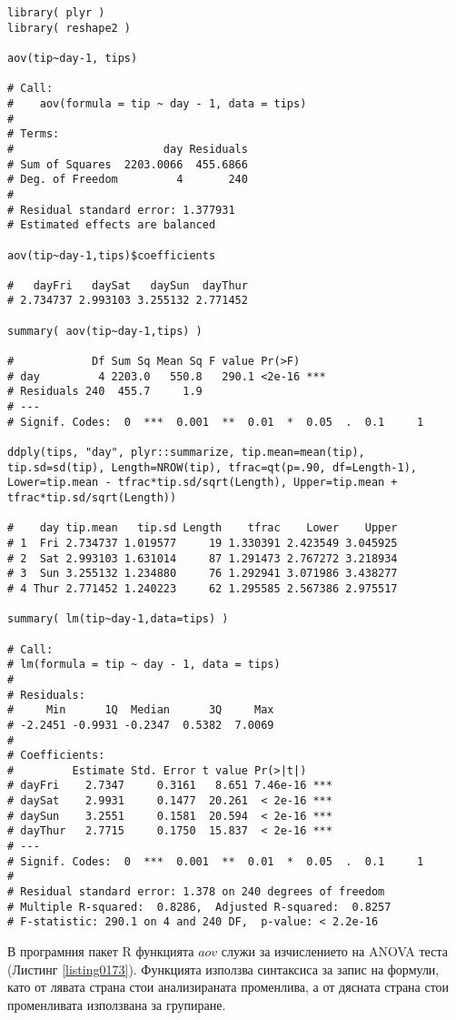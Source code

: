\begin{lstlisting}[caption=ANOVA тест, label=listing0173]
library( plyr )
library( reshape2 )

aov(tip~day-1, tips)

# Call:
#    aov(formula = tip ~ day - 1, data = tips)
# 
# Terms:
#                       day Residuals
# Sum of Squares  2203.0066  455.6866
# Deg. of Freedom         4       240
# 
# Residual standard error: 1.377931
# Estimated effects are balanced

aov(tip~day-1,tips)$coefficients

#   dayFri   daySat   daySun  dayThur 
# 2.734737 2.993103 3.255132 2.771452 

summary( aov(tip~day-1,tips) )

#            Df Sum Sq Mean Sq F value Pr(>F)    
# day         4 2203.0   550.8   290.1 <2e-16 ***
# Residuals 240  455.7     1.9                   
# ---
# Signif. Codes:  0  ***  0.001  **  0.01  *  0.05  .  0.1     1

ddply(tips, "day", plyr::summarize, tip.mean=mean(tip), tip.sd=sd(tip), Length=NROW(tip), tfrac=qt(p=.90, df=Length-1), Lower=tip.mean - tfrac*tip.sd/sqrt(Length), Upper=tip.mean + tfrac*tip.sd/sqrt(Length))

#    day tip.mean   tip.sd Length    tfrac    Lower    Upper
# 1  Fri 2.734737 1.019577     19 1.330391 2.423549 3.045925
# 2  Sat 2.993103 1.631014     87 1.291473 2.767272 3.218934
# 3  Sun 3.255132 1.234880     76 1.292941 3.071986 3.438277
# 4 Thur 2.771452 1.240223     62 1.295585 2.567386 2.975517

summary( lm(tip~day-1,data=tips) )

# Call:
# lm(formula = tip ~ day - 1, data = tips)
# 
# Residuals:
#     Min      1Q  Median      3Q     Max 
# -2.2451 -0.9931 -0.2347  0.5382  7.0069 
# 
# Coefficients:
#         Estimate Std. Error t value Pr(>|t|)    
# dayFri    2.7347     0.3161   8.651 7.46e-16 ***
# daySat    2.9931     0.1477  20.261  < 2e-16 ***
# daySun    3.2551     0.1581  20.594  < 2e-16 ***
# dayThur   2.7715     0.1750  15.837  < 2e-16 ***
# ---
# Signif. Codes:  0  ***  0.001  **  0.01  *  0.05  .  0.1     1
# 
# Residual standard error: 1.378 on 240 degrees of freedom
# Multiple R-squared:  0.8286,	Adjusted R-squared:  0.8257 
# F-statistic: 290.1 on 4 and 240 DF,  p-value: < 2.2e-16
\end{lstlisting}

В програмния пакет R функцията $aov$ служи за изчислението на ANOVA теста (Листинг \ref{listing0173}). Функцията използва синтаксиса за запис на формули, като от лявата страна стои анализираната променлива, а от дясната страна стои променливата използвана за групиране. 

